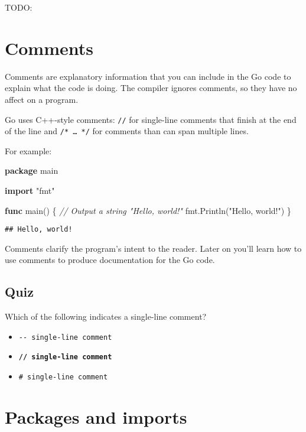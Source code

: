 \documentclass[]{book}
\newenvironment{Shaded}{\begin{snugshade}}{\end{snugshade}}
\newcommand{\CommentTok}[1]{\textcolor[rgb]{0.56,0.35,0.01}{\textit{#1}}}
\newcommand{\KeywordTok}[1]{\textcolor[rgb]{0.13,0.29,0.53}{\textbf{#1}}}
\newcommand{\NormalTok}[1]{#1}
\newcommand{\StringTok}[1]{\textcolor[rgb]{0.31,0.60,0.02}{#1}}
\providecommand{\tightlist}{%
  \setlength{\itemsep}{0pt}\setlength{\parskip}{0pt}}
\let\BeginKnitrBlock\begin \let\EndKnitrBlock\end
\begin{document}
TODO:

\hypertarget{comments}{%
\section{Comments}\label{comments}}

Comments are explanatory information that you can include in the Go code to
explain what the code is doing. The compiler ignores comments, so they have no
affect on a program.

Go uses C++-style comments: \texttt{//} for single-line comments that finish at the
end of the line and \texttt{/*~\ldots{}~*/} for comments than can span multiple lines.

For example:

\begin{Shaded}
\begin{Highlighting}[]
\KeywordTok{package}\NormalTok{ main}

\KeywordTok{import} \StringTok{"fmt"}

\KeywordTok{func}\NormalTok{ main() \{}
    \CommentTok{// Output a string "Hello, world!"}
\NormalTok{    fmt.Println(}\StringTok{"Hello, world!"}\NormalTok{)}
\NormalTok{\}}
\end{Highlighting}
\end{Shaded}

\begin{verbatim}
## Hello, world!
\end{verbatim}

\BeginKnitrBlock{rmdnote}
Comments clarify the program's intent to the reader. Later on you'll learn
how to use comments to produce documentation for the Go code.
\EndKnitrBlock{rmdnote}

\hypertarget{quiz-11}{%
\subsection{Quiz}\label{quiz-11}}

Which of the following indicates a single-line comment?

\begin{itemize}
\tightlist
\item
  \texttt{-\/-\ single-line\ comment}
\item
  \textbf{\texttt{//\ single-line\ comment}}
\item
  \texttt{\#\ single-line\ comment}
\end{itemize}

\hypertarget{packages-and-imports}{%
\section{Packages and imports}\label{packages-and-imports}}
\end{document}
